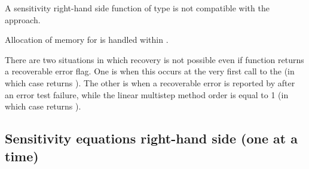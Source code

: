 {
  {\warn}A sensitivity right-hand side function of type  is not
  compatible with the  approach.

  Allocation of memory for  is handled within {\cvodes}.

  There are two situations in which recovery is not possible even if 
  function returns a recoverable error flag.  One is when this
  occurs at the very first call to the  (in which case {\cvodes} returns
  ).  The other is when a recoverable error is reported
  by  after an error test failure, while the linear multistep method
  order is equal to 1 (in which case {\cvodes} returns ).
}

\subsection{Sensitivity equations right-hand side (one at a time)}
  
